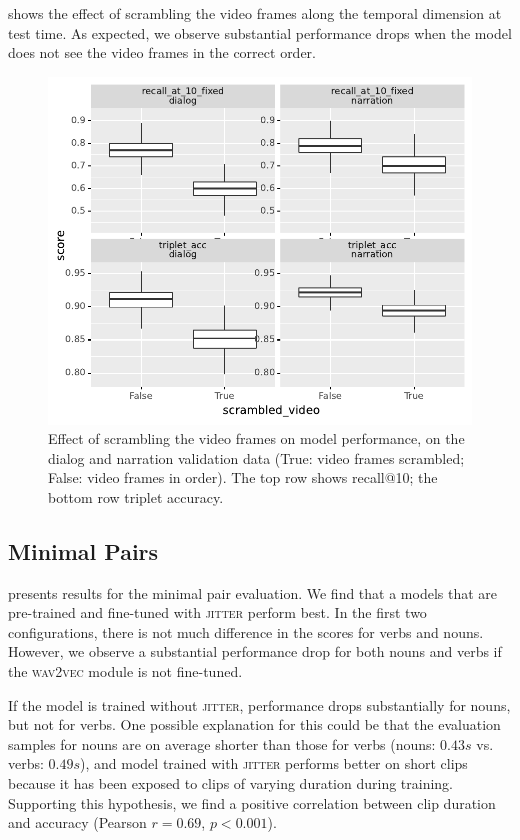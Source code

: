  shows the effect of scrambling the video frames 
along the temporal dimension at test time. As expected, we observe substantial 
performance drops when the model does not see the video frames in 
the correct order.
\begin{figure}[htb]
	\centering
	\includegraphics[width=\columnwidth]{results/ablations/scrambled_video.pdf}
	\caption{Effect of scrambling the video frames on model performance, on the 
	dialog and narration validation data (True: video frames scrambled;
        False: video frames in order). The top row shows recall@10;
		the bottom row triplet accuracy.}
	\label{fig:scrambled_video}
\end{figure}

\subsection{Minimal Pairs}
\label{sec:minimal-pairs}


 presents results for the minimal pair 
evaluation. We find that a models that are 
pre-trained and fine-tuned with \textsc{jitter} perform best. In the first two 
configurations, there is not much difference in the scores for verbs and nouns. 
However, we observe a substantial performance drop for both nouns and verbs if 
the \textsc{wav2vec} module is not fine-tuned.

If the model is trained without \textsc{jitter}, performance drops substantially
for nouns, but not for verbs. One possible explanation for this could be that 
the evaluation samples for nouns are on average shorter than those for verbs 
(nouns: $0.43s$ vs. verbs: $0.49s$), and model trained with \textsc{jitter} 
performs better on short clips because it has been exposed to clips of varying 
duration during training. Supporting this hypothesis, we find a positive 
correlation between clip duration and accuracy (Pearson $r= 0.69$, $p < 0.001$).

